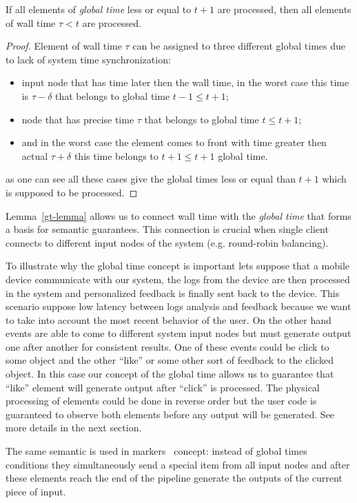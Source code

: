\begin{lemma}
\label{gt-lemma}
If all elements of \textit{global time} less or equal to $t + 1$ are processed, then all elements of wall time $\tau < t$ are processed.
\end{lemma}
\begin{proof}
Element of wall time $\tau$ can be assigned to three different global times due to lack of system time synchronization:
\begin{itemize}
    \item input node that has time later then the wall time, in the worst case this time is $\tau - \delta$ that belongs to global time $t - 1 \le t + 1$;
    \item node that has precise time $\tau$ that belongs to global time $t \le t + 1$;
    \item and in the worst case the element comes to front with time greater then actual $\tau + \delta$ this time belongs to $t + 1 \le t + 1$ global time.
\end{itemize}
as one can see all these cases give the global times less or equal than $t + 1$ which is supposed to be processed.
\end{proof}

Lemma~\ref{gt-lemma} allows us to connect wall time with the \textit{global time} that forms a basis for semantic guarantees. This connection is crucial when single client connects to different input nodes of the system (e.g. round-robin balancing).

To illustrate why the global time concept is important lets suppose that a mobile device communicate with our system, the logs from the device are then processed in the system and personalized feedback is finally sent back to the device. This scenario suppose low latency between logs analysis and feedback because we want to take into account the most recent behavior of the user. On the other hand events are able to come to different system input nodes but must generate output one after another for consistent results. One of these events could be click to some object and the other ``like'' or some other sort of feedback to the clicked object. In this case our concept of the global time allows us to guarantee that ``like'' element will generate output after ``click'' is processed. The physical processing of elements could be done in reverse order but the user code is guaranteed to observe both elements before any output will be generated. See more details in the next section.

The same semantic is used in markers~\cite{Carbone:2017:SMA:3137765.3137777} concept: instead of global times conditions they simultaneously send a special item from all input nodes and after these elements reach the end of the pipeline generate the outputs of the current piece of input.

